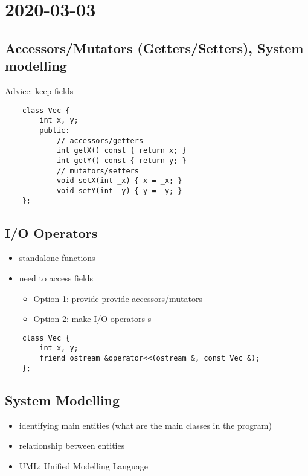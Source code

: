 \section{2020-03-03}
\subsection{Accessors/Mutators (Getters/Setters), System modelling}
Advice: keep fields 

\begin{lstlisting}
    class Vec {
        int x, y;
        public:
            // accessors/getters
            int getX() const { return x; }
            int getY() const { return y; }
            // mutators/setters
            void setX(int _x) { x = _x; }
            void setY(int _y) { y = _y; }
    };
\end{lstlisting}

\subsection{I/O Operators}
\begin{itemize}
    \item standalone functions
    \item need to access fields
          \begin{itemize}
              \item Option 1: provide provide accessors/mutators
              \item Option 2: make I/O operators s
          \end{itemize}
\end{itemize}

\begin{lstlisting}
    class Vec {
        int x, y;
        friend ostream &operator<<(ostream &, const Vec &);
    };
\end{lstlisting}

\subsection{System Modelling}
\begin{itemize}
    \item identifying main entities (what are the main classes in the program)
    \item relationship between entities
    \item UML\@: Unified Modelling Language
\end{itemize}


